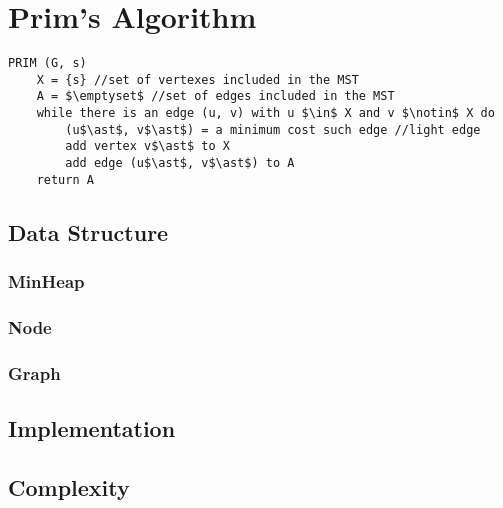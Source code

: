 \section{Prim's Algorithm}\label{prim}

\begin{lstlisting}[mathescape=true]
PRIM (G, s)
	X = {s} //set of vertexes included in the MST
	A = $\emptyset$ //set of edges included in the MST
	while there is an edge (u, v) with u $\in$ X and v $\notin$ X do
		(u$\ast$, v$\ast$) = a minimum cost such edge //light edge
		add vertex v$\ast$ to X
		add edge (u$\ast$, v$\ast$) to A
	return A	

\end{lstlisting}


\subsection{Data Structure}
	
	\subsubsection{MinHeap}
				
	\subsubsection{Node}
		
	\subsubsection{Graph}
		

\subsection{Implementation}

\subsection{Complexity}

	
\pagebreak